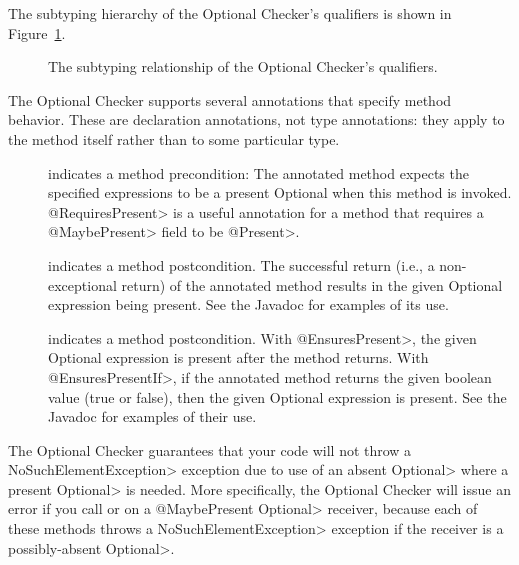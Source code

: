 The subtyping hierarchy of the Optional Checker's qualifiers is shown in
Figure~\ref{fig-optional-hierarchy}.

\begin{figure}
\caption{The subtyping relationship of the Optional Checker's qualifiers.}
\label{fig-optional-hierarchy}
\end{figure}


The Optional Checker supports several annotations that specify method
behavior.  These are declaration annotations, not type annotations:  they
apply to the method itself rather than to some particular type.

\begin{description}

\item[]
  indicates a method precondition:  The annotated method expects the
  specified expressions to be a present Optional when this
  method is invoked. \<@RequiresPresent> is a useful annotation for a method
  that requires a \<@MaybePresent> field to be \<@Present>.
\item[]
  indicates a method postcondition.
  The successful return (i.e., a non-exceptional return) of the annotated
  method results in the given Optional expression being present. See the Javadoc
  for examples of its use.
\item[]
  indicates a method postcondition.  With \<@EnsuresPresent>, the given
  Optional expression is present after the method returns.  With
  \<@EnsuresPresentIf>, if the annotated
  method returns the given boolean value (true or false), then the given
  Optional expression is present. See the Javadoc for examples of their use.

\end{description}



The Optional Checker guarantees that your code will not throw a \<NoSuchElementException> exception
due to use of an absent \<Optional> where a present \<Optional> is needed.
More specifically, the Optional Checker will issue an error if you call
or
on a \<@MaybePresent Optional> receiver, because each of these methods
throws a \<NoSuchElementException> exception if the receiver is a possibly-absent
\<Optional>.

